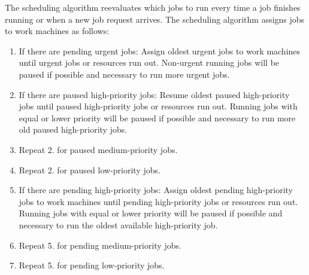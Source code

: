 The scheduling algorithm reevaluates which jobs to run every time a job finishes running or when a new job request arrives.
The scheduling algorithm assigns jobs to work machines as follows:
\begin{enumerate}
\item If there are pending urgent jobs:
Assign oldest urgent jobs to work machines until urgent jobs or resources run out.
Non-urgent running jobs will be paused if possible and necessary to run more urgent jobs.
\item If there are paused high-priority jobs:
Resume oldest paused high-priority jobs until paused high-priority jobs or resources run out.
Running jobs with equal or lower priority will be paused if possible and necessary to run more old paused high-priority jobs.
\item Repeat 2. for paused medium-priority jobs.
\item Repeat 2. for paused low-priority jobs.
\item If there are pending high-priority jobs:
Assign oldest pending high-priority jobs to work machines until pending high-priority jobs or resources run out.
Running jobs with equal or lower priority will be paused if possible and necessary to run the oldest available high-priority job.
\item Repeat 5. for pending medium-priority jobs.
\item Repeat 5. for pending low-priority jobs.
\end{enumerate}